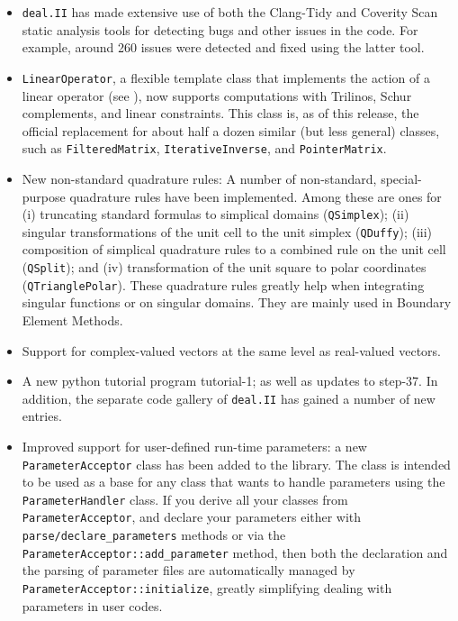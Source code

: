\documentclass{ansarticle-preprint}
\newcommand{\specialword}[1]{\texttt{#1}}
\newcommand{\dealii}{{\specialword{deal.II}}\xspace}
\begin{document}
\begin{itemize}
\item \dealii has made extensive use of both the Clang-Tidy \cite{clang-tidy}
  and Coverity Scan \cite{coverity} static analysis tools for detecting bugs
  and other issues in the code. For example, around 260 issues were detected and
  fixed using the latter tool.

\item
  \texttt{LinearOperator}, a flexible template class that implements the action of a
  linear operator (see \cite{MaierBardelloniHeltai-2016-b}), now supports
  computations with Trilinos, Schur complements, and linear constraints. This
  class is, as of this release, the official replacement for about half a dozen
  similar (but less general) classes, such as \texttt{FilteredMatrix},
  \texttt{IterativeInverse}, and \texttt{PointerMatrix}.

\item New non-standard quadrature rules:
A number of non-standard, special-purpose quadrature rules have been
implemented. Among these are ones for
(i) truncating standard formulas to simplical domains (\texttt{QSimplex});
(ii) singular transformations of the unit cell to the unit simplex
    (\texttt{QDuffy});
(iii) composition of simplical quadrature rules to a combined rule on the
    unit cell (\texttt{QSplit});
and (iv) transformation of the unit square to polar coordinates
    (\texttt{QTrianglePolar}).
These quadrature rules greatly help when integrating singular
functions or on singular domains. They
are mainly used in Boundary Element Methods.


\item
  Support for complex-valued vectors at the same level as real-valued
  vectors.

\item A new python tutorial program tutorial-1; as well as
  updates to step-37. In addition, the separate code
  gallery of \dealii has gained a number of new entries.

\item Improved support for user-defined run-time parameters: a new \texttt{ParameterAcceptor}
  class has been added to the library. The class is intended to be used as a
  base for any class that wants to handle parameters using the
  \texttt{ParameterHandler} class. If you derive all your classes from
  \texttt{ParameterAcceptor}, and declare your parameters either with
  \texttt{parse/declare\_parameters} methods or via the
  \texttt{ParameterAcceptor::add\_parameter} method, then both the
  declaration and the
  parsing of parameter files are automatically managed by
  \texttt{ParameterAcceptor::initialize}, greatly simplifying
  dealing with parameters in user codes.


\end{itemize}
\end{document}
